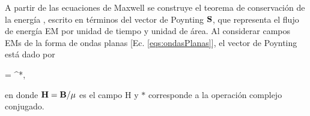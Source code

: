 A partir de las ecuaciones de Maxwell se construye el teorema de conservación de la energía \cite{griffiths2013electrodynamics}, escrito en términos del vector de Poynting $\vb{S}$, que representa el flujo de energía EM por unidad de tiempo y unidad de área. Al considerar campos EMs de la forma de ondas planas [Ec. \eqref{eqs:ondasPlanas}], el vector de Poynting está dado por \cite{hecht1998optics}\vspace*{-.75em}
%
	\begin{tcolorbox}[title = Vector de Poynting, ams align]
	 = \times{}^*,  \label{eq:Poynting}
	\end{tcolorbox} \vspace*{-.75em}\noindent
%
en donde $\vb{H}=\vb{B}/\mu$ es el campo H y $*$ corresponde a la operación complejo conjugado.

